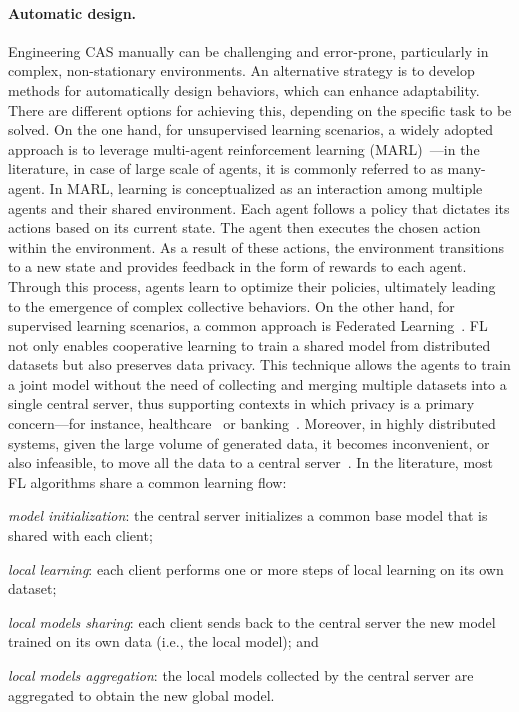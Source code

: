 \documentclass[12pt]{article}
\begin{document}
\paragraph{Automatic design.}
Engineering CAS manually can be challenging and error-prone, particularly in complex, 
 non-stationary environments. 
% 
An alternative strategy is to develop methods for automatically design 
 behaviors, which can enhance adaptability.
%
There are different options for achieving this, depending on the specific task to be solved. 
%
On the one hand, for unsupervised learning scenarios, a widely adopted approach is to leverage multi-agent 
 reinforcement learning (MARL)~\cite{DBLP:journals/corr/abs-1911-10635,DBLP:journals/tsmc/BusoniuBS08}---in the 
 literature, in case of large scale of agents, it is commonly referred to as many-agent. 
% 
In MARL, learning is conceptualized as an interaction among multiple agents and their shared environment. 
%
Each agent follows a policy that dictates its actions based on its current state. 
%
The agent then executes the chosen action within the environment. 
%
As a result of these actions, the environment transitions to a new state and provides feedback 
 in the form of rewards to each agent. 
% 
Through this process, agents learn to optimize their policies, ultimately leading to the 
 emergence of complex collective behaviors.
%
On the other hand, for supervised learning scenarios, a common approach is 
 Federated Learning~\cite{DBLP:conf/aistats/McMahanMRHA17}.
%
FL not only enables cooperative learning to train a shared model from distributed datasets
 but also preserves data privacy.
%
This technique allows the agents to train a joint model without the need of collecting and merging
 multiple datasets into a single central server, thus supporting contexts in which privacy is a primary 
 concern---for instance, healthcare~\cite{DBLP:journals/csur/NguyenPPDSLDH23} 
 or banking~\cite{DBLP:series/lncs/LongT0Z20}.
%
Moreover, in highly distributed systems, given the large volume of generated data, it becomes inconvenient, 
 or also infeasible, to move all the data to a central server~\cite{DBLP:journals/comsur/NguyenDPSLP21}.
%
In the literature, most FL algorithms share a common learning flow: 
 \begin{enumerate*}[label=(\roman*)]
	\item \emph{model initialization}: the central server initializes a common base model that is shared with each client;
	\item \emph{local learning}: each client performs one or more steps of local learning on its own dataset;
	\item \emph{local models sharing}: each client sends back to the central server the new model trained on its own data 
     (i.e., the local model); and
	\item \emph{local models aggregation}: the local models collected by the central server are aggregated to obtain the 
     new global model.
 \end{enumerate*}
\end{document}
